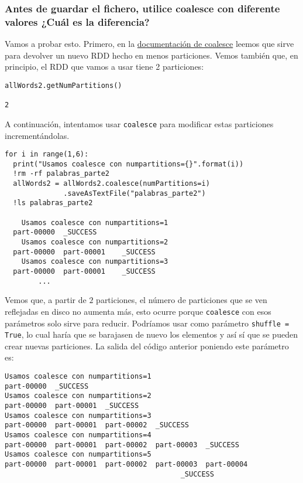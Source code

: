 \documentclass[11pt]{article}
\def\inline{\lstinline[basicstyle=\ttfamily,keywordstyle={}]}
\begin{document}
\subsubsection*{Antes de guardar el fichero, utilice coalesce con diferente valores ¿Cuál es la diferencia?}


Vamos a probar esto. Primero, en la \href{https://spark.apache.org/docs/latest/api/python/reference/api/pyspark.RDD.coalesce.html}{documentación de coalesce} leemos que sirve para devolver un nuevo RDD hecho en menos particiones. Vemos también que, en principio, el RDD que vamos a usar tiene 2 particiones:

\begin{verbatim}
allWords2.getNumPartitions()

2
\end{verbatim}

A continuación, intentamos usar \inline{coalesce} para modificar estas particiones incrementándolas.

\begin{verbatim}
for i in range(1,6):
  print("Usamos coalesce con numpartitions={}".format(i))
  !rm -rf palabras_parte2
  allWords2 = allWords2.coalesce(numPartitions=i)
              .saveAsTextFile("palabras_parte2")
  !ls palabras_parte2
	
	Usamos coalesce con numpartitions=1
  part-00000  _SUCCESS
	Usamos coalesce con numpartitions=2
  part-00000  part-00001	_SUCCESS
	Usamos coalesce con numpartitions=3
  part-00000  part-00001	_SUCCESS
		...
\end{verbatim}

Vemos que, a partir de $2$ particiones, el número de particiones que se ven reflejadas en disco no aumenta más, esto ocurre porque \inline{coalesce} con esos parámetros solo sirve para reducir. Podríamos usar como parámetro \inline{shuffle = True}, lo cual haría que se barajasen de nuevo los elementos y así sí que se pueden crear nuevas particiones. La salida del código anterior poniendo este parámetro es: 

\begin{verbatim}
Usamos coalesce con numpartitions=1
part-00000  _SUCCESS
Usamos coalesce con numpartitions=2
part-00000  part-00001	_SUCCESS
Usamos coalesce con numpartitions=3
part-00000  part-00001	part-00002  _SUCCESS
Usamos coalesce con numpartitions=4
part-00000  part-00001	part-00002  part-00003	_SUCCESS
Usamos coalesce con numpartitions=5
part-00000  part-00001	part-00002  part-00003	part-00004 
                                          _SUCCESS
\end{verbatim}
\end{document}
